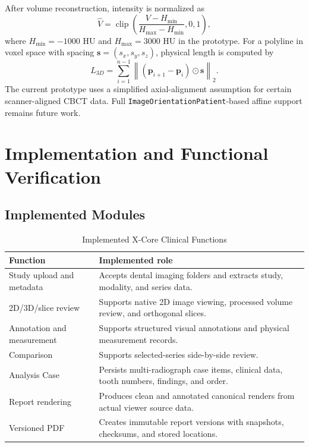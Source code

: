 \documentclass[journal]{IEEEtran}
\begin{document}
After volume reconstruction, intensity is normalized as
\begin{equation}
\hat{V}=\operatorname{clip}\left(\frac{V-H_{\min}}{H_{\max}-H_{\min}},0,1\right),
\end{equation}
where $H_{\min}=-1000$ HU and $H_{\max}=3000$ HU in the prototype. For a polyline in voxel space with spacing $\mathbf{s}=(s_x,s_y,s_z)$, physical length is computed by
\begin{equation}
L_{3D}=\sum_{i=1}^{n-1}\left\|(\mathbf{p}_{i+1}-\mathbf{p}_i)\odot\mathbf{s}\right\|_2.
\end{equation}
The current prototype uses a simplified axial-alignment assumption for certain scanner-aligned CBCT data. Full \texttt{ImageOrientationPatient}-based affine support remains future work.

\section{Implementation and Functional Verification}
\label{sec:implementation}

\subsection{Implemented Modules}

\begin{table}[!t]
\caption{Implemented X-Core Clinical Functions}
\label{tab:modules}
\centering
\begin{tabular}{p{2.5cm}p{4.7cm}}
\toprule
\textbf{Function} & \textbf{Implemented role}\\
\midrule
Study upload and metadata & Accepts dental imaging folders and extracts study, modality, and series data.\\
2D/3D/slice review & Supports native 2D image viewing, processed volume review, and orthogonal slices.\\
Annotation and measurement & Supports structured visual annotations and physical measurement records.\\
Comparison & Supports selected-series side-by-side review.\\
Analysis Case & Persists multi-radiograph case items, clinical data, tooth numbers, findings, and order.\\
Report rendering & Produces clean and annotated canonical renders from actual viewer source data.\\
Versioned PDF & Creates immutable report versions with snapshots, checksums, and stored locations.\\
\bottomrule
\end{tabular}
\end{table}
\end{document}
